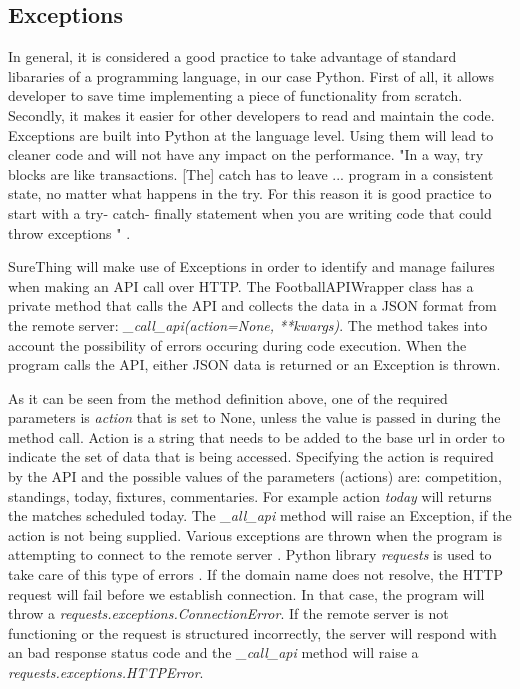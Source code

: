 \subsection{Exceptions}
\label{subsec:exceptions}
In general, it is considered a good practice to take advantage of standard libararies of a programming language, in our case Python. First of all, it allows developer to save time implementing a piece of functionality from scratch. Secondly, it makes it easier for other developers to read and maintain the code. Exceptions are built into Python at the language level. Using them will lead to cleaner code and will not have any impact on the performance. "In a way, try blocks are like transactions. [The] catch has to leave ... program in a consistent state, no matter what happens in the try. For this reason it is good practice to start with a try- catch- finally statement when you are writing code that could throw exceptions " \citet{book:martin2011robert}.
 
SureThing will make use of Exceptions in order to identify and manage failures when making an API call over HTTP. The FootballAPIWrapper class has a private method that calls the API and collects the data in a JSON format from the remote server: \emph{\_call\_api(action=None, **kwargs)}. The method takes into account the possibility of errors occuring during code execution. When the program calls the API, either JSON data is returned or an Exception is thrown. 

As it can be seen from the method definition above, one of the required parameters is \emph{action} that is set to None, unless the value is passed in during the method call. Action is a string that needs to be added to the base url in order to indicate the set of data that is being accessed. Specifying the action is required by the API and the possible values of the parameters (actions) are: competition, standings, today, fixtures, commentaries. For example action \emph{today} will returns the matches scheduled today. The \emph{\_all\_api} method will raise an Exception, if the action is not being supplied. Various exceptions are thrown when the program is attempting to connect to the remote server \citet{article:httpRequestsExceptions}. Python library \emph{requests} is used to take care of this type of errors \citet{documentation:PythonRequests}. If the domain name does not resolve, the HTTP request will fail before we establish connection. In that case, the program will throw a \emph{requests.exceptions.ConnectionError}. If the remote server is not functioning or the request is structured incorrectly, the server will respond with an bad response status code and the \emph{\_call\_api} method will raise a \emph{requests.exceptions.HTTPError}.

